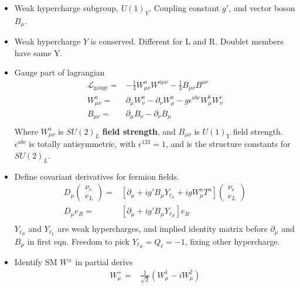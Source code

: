 \begin{itemize}
\begin{itemize}
        \item Weak hypercharge subgroup, $U(1)_Y$. Coupling constant $g'$, and vector boson $B_\mu$. \cite{wells}
        \item Weak hypercharge $Y$ is conserved. Different for L and R. Doublet members have same Y. \cite{wells}
        \item Gauge part of lagrangian \cite{wells}
        \begin{equation}\begin{split}
        \mathcal{L}_\text{gauge}=&-\frac{1}{4}W^a_{\mu\nu}W^{a\mu\nu}-\frac{1}{4}B_{\mu\nu}B^{\mu\nu} \\
        W^a_{\mu\nu}=&\partial_\mu W^a_\nu-\partial_\nu W^a_\mu-g\epsilon^{abc}W^b_\mu W^c_\nu \\
        B_{\mu\nu}=&\partial_\mu B_\nu-\partial_\nu B_\mu \\
        \end{split}\end{equation}
        Where $W^a_{\mu\nu}$ is $SU(2)_L$ \textbf{field strength}, and $B_{\mu\nu}$ is $U(1)_Y$ field strength. $\epsilon^{abc}$ is totally antisymmetric, with $\epsilon^{123}=1$, and is the structure constants for $SU(2)_L$.
        \item Define covariant derivatives for fermion fields. \cite{wells}
        \begin{equation}\begin{split}
        D_\mu\begin{pmatrix}\nu_e\\e_L\end{pmatrix}=&[\partial_\mu+ig'B_\mu Y_{\ell_L}+igW^a_\mu T^a]\begin{pmatrix}\nu_e\\e_L\end{pmatrix} \\
        D_\mu e_R=&[\partial_\mu+ig'B_\mu Y_{\ell_R}]e_R \\
        \end{split}\end{equation}
        $Y_{\ell_R}$ and $Y_{\ell_L}$ are weak hypercharges, and implied identity matrix before $\partial_\mu$ and $B_\mu$ in first eqn. Freedom to pick $Y_{\ell_R}=Q_\ell=-1$, fixing other hypercharge.
        \item Identify SM $W^\pm$ in partial derivs \cite{wells}
        \begin{equation}\begin{split}
        W_\mu^+=&\frac{1}{\sqrt{2}}(W_\mu^1-iW_\mu^2) \\

\end{split}
\end{equation}
\end{itemize}
\end{itemize}
